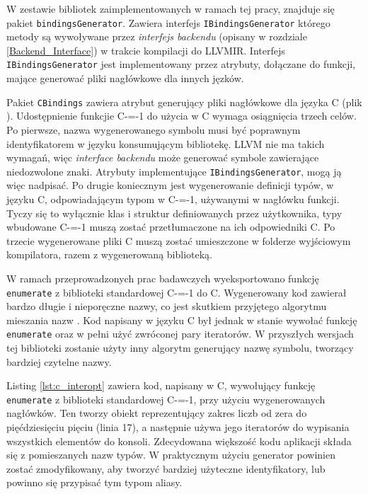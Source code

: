 W zestawie bibliotek zaimplementowanych w ramach tej pracy, znajduje się pakiet \lstinline{bindingsGenerator}.
Zawiera interfejs \lstinline{IBindingsGenerator} którego metody są wywoływane przez \emph{interfejs backendu} (opisany w rozdziale \ref{Backend_Interface}) w trakcie kompilacji do LLVMIR.
Interfejs \lstinline{IBindingsGenerator} jest implementowany przez atrybuty, dołączane do funkcji, mające generować pliki nagłówkowe dla innych jęzków.

Pakiet \lstinline{CBindings} zawiera atrybut generujący pliki nagłówkowe dla języka C (plik\\ ).
Udostępnienie funkcjie C-=-1 do użycia w C wymaga osiągnięcia trzech celów.
Po pierwsze, nazwa wygenerowanego symbolu musi być poprawnym identyfikatorem w języku konsumującym bibliotekę.
LLVM nie ma takich wymagań, więc \emph{interface backendu} może generować symbole zawierające niedozwolone znaki.
Atrybuty implementujące \lstinline{IBindingsGenerator}, mogą ją więc nadpisać.
Po drugie koniecznym jest wygenerowanie definicji typów, w języku C, odpowiadającym typom w C-=-1, używanymi w nagłówku funkcji.
Tyczy się to wyłącznie klas i struktur definiowanych przez użytkownika, typy wbudowane C-=-1 muszą zostać przetłumaczone na ich odpowiedniki C.
Po trzecie wygenerowane pliki C muszą zostać umieszczone w folderze wyjściowym kompilatora, razem z wygenerowaną biblioteką.

W ramach przeprowadzonych prac badawczych wyeksportowano funkcję \lstinline{enumerate} z biblioteki standardowej C-=-1 do C.
Wygenerowany kod zawierał bardzo długie i nieporęczne nazwy, co jest skutkiem przyjętego algorytmu mieszania nazw \cite{wen2006analysis}.
Kod napisany w języku C był jednak w stanie wywołać funkcję \lstinline{enumerate} oraz w pełni użyć zwróconej pary iteratorów.
W przyszłych wersjach tej biblioteki zostanie użyty inny algorytm generujący nazwę symbolu, tworzący bardziej czytelne nazwy.

Listing \ref{lst:c_interopt} zawiera kod, napisany w C, wywołujący funkcję \lstinline{enumerate} z biblioteki standardowej C-=-1, przy użyciu wygenerowanych nagłówków.
Ten tworzy obiekt reprezentujący zakres liczb od zera do pięćdziesięciu pięciu (linia 17), a następnie używa jego iteratorów do wypisania wszystkich elementów do konsoli.
Zdecydowana większość kodu aplikacji składa się z pomieszanych nazw typów.
W praktycznym użyciu generator powinien zostać zmodyfikowany, aby tworzyć bardziej użyteczne identyfikatory, lub powinno się przypisać tym typom aliasy.

